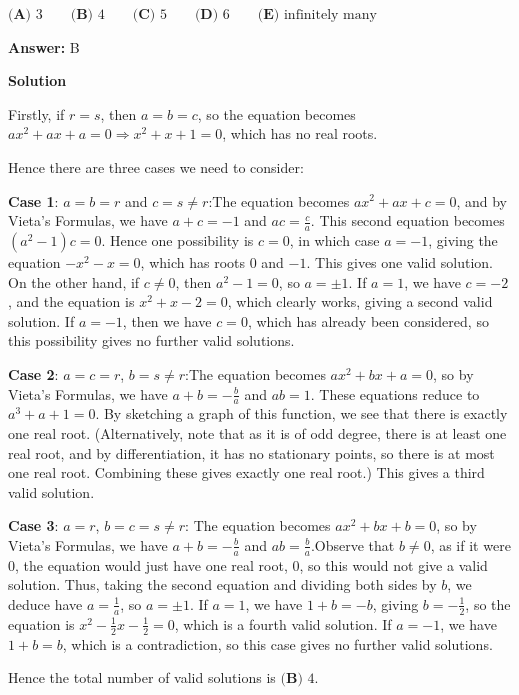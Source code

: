\begin{enumerate}
 $\textbf{(A) } 3 \qquad\textbf{(B) } 4 \qquad\textbf{(C) } 5 \qquad\textbf{(D) } 6 \qquad\textbf{(E) } \text{infinitely many}$

 \textbf{Answer: }B



\textbf{Solution}

Firstly, if $r=s$, then $a=b=c$, so the equation becomes $ax^2 + ax + a = 0 \Rightarrow x^2 + x + 1=0$, which has no real roots.

 Hence there are three cases we need to consider:

 \textbf{Case 1}: $a=b=r$ and $c=s \neq r$:The equation becomes $ax^2+ax+c=0$, and by Vieta's Formulas, we have $a+c=-1$ and $ac = \frac{c}{a}$. This second equation becomes $(a^2-1)c=0$. Hence one possibility is $c=0$, in which case $a=-1$, giving the equation $-x^2 - x = 0$, which has roots $0$ and ${-}1$. This gives one valid solution. On the other hand, if $c\neq 0$, then $a^2-1=0$, so $a = \pm 1$. If $a=1$, we have $c=-2$, and the equation is $x^2 + x - 2 = 0$, which clearly works, giving a second valid solution. If $a=-1$, then we have $c=0$, which has already been considered, so this possibility gives no further valid solutions.

 \textbf{Case 2}: $a=c=r$, $b=s \neq r$:The equation becomes $ax^2 + bx + a = 0$, so by Vieta's Formulas, we have $a+b = -\frac{b}{a}$ and $ab = 1$. These equations reduce to $a^3 + a + 1 = 0$. By sketching a graph of this function, we see that there is exactly one real root. (Alternatively, note that as it is of odd degree, there is at least one real root, and by differentiation, it has no stationary points, so there is at most one real root. Combining these gives exactly one real root.) This gives a third valid solution.

 \textbf{Case 3}: $a=r$, $b=c=s \neq r$: The equation becomes $ax^2 + bx+b=0$, so by Vieta's Formulas, we have $a+b = -\frac{b}{a}$ and $ab = \frac{b}{a}$.Observe that $b \neq 0$, as if it were $0$, the equation would just have one real root, $0$, so this would not give a valid solution. Thus, taking the second equation and dividing both sides by $b$, we deduce have $a=\frac{1}{a}$, so $a=\pm 1$. If $a=1$, we have $1+b=-b$, giving $b=-\frac{1}{2}$, so the equation is $x^2 - \frac{1}{2}x - \frac{1}{2} = 0$, which is a fourth valid solution. If $a=-1$, we have $1+b=b$, which is a contradiction, so this case gives no further valid solutions.

 Hence the total number of valid solutions is $\boxed{\textbf{(B) } 4}$.


\end{enumerate}

